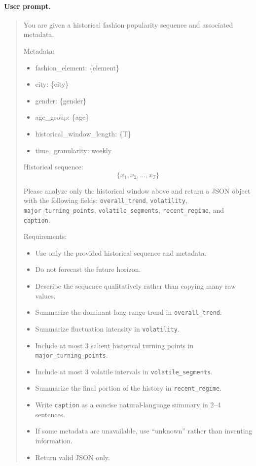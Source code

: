 \documentclass[Afour,sageh,times]{sagej}
\begin{document}
{\paragraph{User prompt.}
\begin{quote}
\small
You are given a historical fashion popularity sequence and associated metadata.

Metadata:
\begin{itemize}
    \item fashion\_element: \{element\}
    \item city: \{city\}
    \item gender: \{gender\}
    \item age\_group: \{age\}
    \item historical\_window\_length: \{T\}
    \item time\_granularity: weekly
\end{itemize}

Historical sequence:
\[
\{x_1, x_2, \dots, x_T\}
\]

Please analyze only the historical window above and return a JSON object with the following fields:
\texttt{overall\_trend}, \texttt{volatility}, \texttt{major\_turning\_points}, \texttt{volatile\_segments}, \texttt{recent\_regime}, and \texttt{caption}.

Requirements:
\begin{itemize}
    \item Use only the provided historical sequence and metadata.
    \item Do not forecast the future horizon.
    \item Describe the sequence qualitatively rather than copying many raw values.
    \item Summarize the dominant long-range trend in \texttt{overall\_trend}.
    \item Summarize fluctuation intensity in \texttt{volatility}.
    \item Include at most 3 salient historical turning points in \texttt{major\_turning\_points}.
    \item Include at most 3 volatile intervals in \texttt{volatile\_segments}.
    \item Summarize the final portion of the history in \texttt{recent\_regime}.
    \item Write \texttt{caption} as a concise natural-language summary in 2--4 sentences.
    \item If some metadata are unavailable, use ``unknown'' rather than inventing information.
    \item Return valid JSON only.
\end{itemize}
\end{quote}

}
\end{document}
